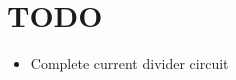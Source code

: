 \documentclass[report]{subfiles}
\begin{document}
\section{TODO}
\listoftodos
\begin{itemize}
\item Complete current divider circuit
\end{itemize}
\newpage
\end{document}
